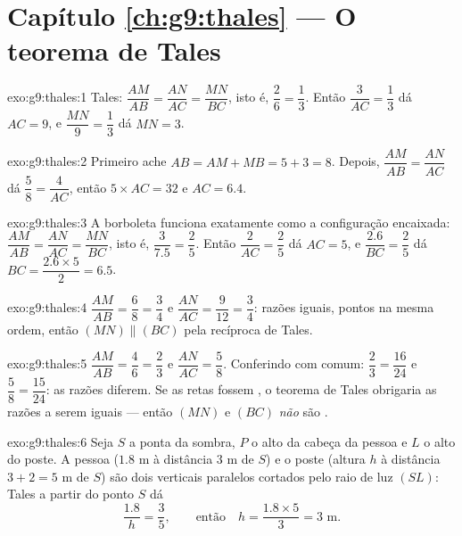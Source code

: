 \section*{Capítulo \ref{ch:g9:thales} --- O teorema de Tales}

\begin{solution}{exo:g9:thales:1}
Tales: $\dfrac{AM}{AB} = \dfrac{AN}{AC} = \dfrac{MN}{BC}$, isto é,
$\dfrac26 = \dfrac13$. Então $\dfrac{3}{AC} = \dfrac13$ dá $AC = 9$, e
$\dfrac{MN}{9} = \dfrac13$ dá $MN = 3$.
\end{solution}

\begin{solution}{exo:g9:thales:2}
Primeiro ache $AB = AM + MB = 5 + 3 = 8$. Depois,
$\dfrac{AM}{AB} = \dfrac{AN}{AC}$ dá $\dfrac58 = \dfrac{4}{AC}$, então
$5 \times AC = 32$ e $AC = 6.4$.
\end{solution}

\begin{solution}{exo:g9:thales:3}
A borboleta funciona exatamente como a configuração encaixada:
$\dfrac{AM}{AB} = \dfrac{AN}{AC} = \dfrac{MN}{BC}$, isto é,
$\dfrac{3}{7.5} = \dfrac25$. Então $\dfrac{2}{AC} = \dfrac25$ dá
$AC = 5$, e $\dfrac{2.6}{BC} = \dfrac25$ dá
$BC = \dfrac{2.6 \times 5}{2} = 6.5$.
\end{solution}

\begin{solution}{exo:g9:thales:4}
$\dfrac{AM}{AB} = \dfrac68 = \dfrac34$ e
$\dfrac{AN}{AC} = \dfrac{9}{12} = \dfrac34$: razões iguais, pontos na
mesma ordem, então $(MN) \parallel (BC)$ pela recíproca de Tales.
\end{solution}

\begin{solution}{exo:g9:thales:5}
$\dfrac{AM}{AB} = \dfrac46 = \dfrac23$ e $\dfrac{AN}{AC} = \dfrac58$.
Conferindo com  comum: $\dfrac23 = \dfrac{16}{24}$ e
$\dfrac58 = \dfrac{15}{24}$: as razões diferem. Se as retas fossem
, o teorema de Tales obrigaria as razões a serem iguais ---
então $(MN)$ e $(BC)$ \emph{não} são .
\end{solution}

\begin{solution}{exo:g9:thales:6}
Seja $S$ a ponta da sombra, $P$ o alto da cabeça da pessoa e $L$ o alto
do poste. A pessoa ($1.8$ m à distância $3$ m de $S$) e o poste (altura
$h$ à distância $3 + 2 = 5$ m de $S$) são dois  verticais
paralelos cortados pelo raio de luz $(SL)$: Tales a partir do ponto $S$
dá
\[
\frac{1.8}{h} = \frac{3}{5},
\qquad\text{então}\quad
h = \frac{1.8 \times 5}{3} = 3 \text{ m}.
\]
\end{solution}


